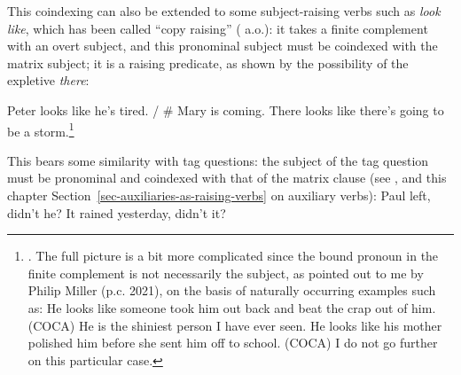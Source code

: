This coindexing can also be extended to some subject-raising verbs such as \emph{look like}, which
has been called ``copy raising'' (\citealp{Rogers74a-u,Hornstein99a-u} a.o.): it takes a finite
complement with an overt subject, and this pronominal subject must be coindexed with the matrix
subject;
it is a raising predicate, as shown by the possibility of the expletive \emph{there}:

\eal
\ex Peter looks like he's tired. / \# Mary is coming.
\ex There looks like there's going to be a storm.\footnote{
\citet[]{Sag2007a}. The full picture is a bit more complicated since the bound pronoun in
the finite complement is not necessarily the subject, as pointed out to me by Philip Miller
(p.c. 2021), on the basis of naturally occurring examples such as: 
\eal
\ex He looks like someone took him out back and beat the crap out of him. (COCA)
\ex He is the shiniest person I have ever seen. He looks like his mother polished him before she sent
him off to school. (COCA) 
\zl
I do not go further on this particular case.
}
\zl



This bears some similarity with  tag questions: the  subject of the tag question must be
pronominal and coindexed with that of the matrix clause (see \citealt{BF99a}, and this chapter Section~\ref{sec-auxiliaries-as-raising-verbs} on auxiliary verbs):
\eal \label{extag}
\ex Paul left, didn't he?\label{ex-paul-left-didnt-he}
\ex It rained yesterday, didn't it?
\zl

